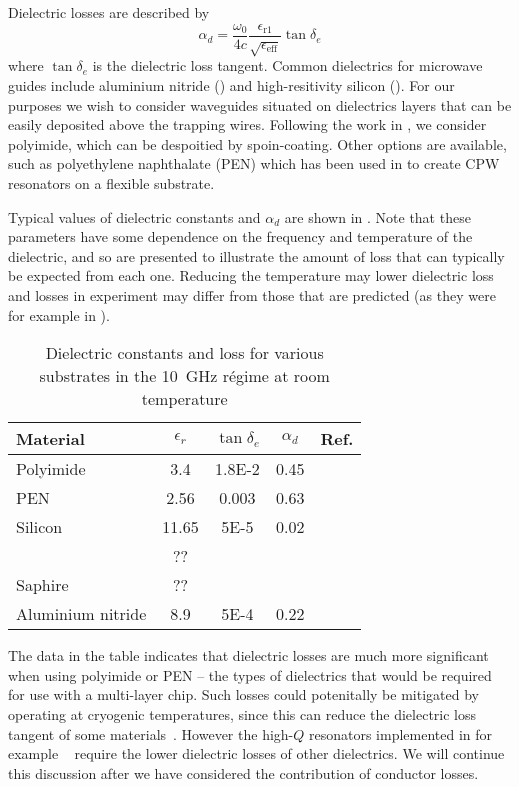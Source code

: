 Dielectric losses  are described
by ~\cite{Collin2007}
\begin{equation}
  \alpha_d =
  \frac{\omega_0}{4c}\frac{\epsilon_\mathrm{r1}}{\sqrt{\epsilon_\mathrm{eff}}}
  \tan \delta_e
\end{equation}
%
where $\tan\delta_e$ is the dielectric loss tangent. Common dielectrics for
microwave guides include aluminium nitride (\AlN{}) and high-resitivity silicon
(\hiresSi{}).  For our purposes we wish to consider waveguides situated on
dielectrics layers that can be easily deposited above the trapping wires.
Following the work in , we consider polyimide, which
can be despoitied by spoin-coating. Other options are available, such as
polyethylene naphthalate (PEN) which has been used in \inlineref{} to create
CPW resonators on a flexible substrate.

Typical values of dielectric constants and $\alpha_d$ are shown in
. Note that these parameters have some dependence
on the frequency and temperature of the dielectric, and so are presented to
illustrate the amount of loss that can typically be expected from each one.
Reducing the temperature may lower dielectric loss and losses in experiment may
differ from those that are predicted (as they were for example in \inlineref{}
).

\begin{table}[ht]
  \caption{Dielectric constants and loss for various substrates in the
  \SI{10}{\giga\hertz} r\'egime at room temperature}
\centering
\begin{tabular}{l c c c c }
\hline\hline
  Material & $\epsilon_r$ & $\tan\delta_e$ & $\alpha_d$ & Ref. \\ [ 0.5ex]
\hline
  Polyimide & 3.4 & \SI{1.8E-2}{} & 0.45 & \cite{} \\
  PEN & 2.56 & 0.003 & 0.63 & \cite{} \\
  Silicon & 11.65 & \SI{5E-5}{} & 0.02 & \cite{} \\
  \hiresSi{} & ?? \\
  Saphire & ?? \\
  Aluminium nitride & 8.9 & \SI{5E-4}{} & 0.22 & \cite{} \\
\hline
\end{tabular}
\label{mws:table:diprops} %
\end{table}

The data in the table indicates that dielectric losses are much more
significant when using polyimide or PEN -- the types of dielectrics that would
be required for use with a multi-layer chip. Such losses could potenitally be
mitigated by operating at cryogenic temperatures, since this can reduce the
dielectric loss tangent of some materials~\cite{}. However the high-$Q$
resonators implemented in for example ~\cite{}
require the lower dielectric losses of other dielectrics. We will continue this
discussion after we have considered the
contribution of conductor losses.

